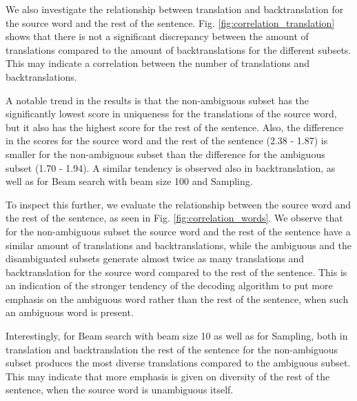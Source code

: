 We also investigate the relationship between translation and backtranslation for the source word and the rest of the sentence. Fig. \ref{fig:correlation_translation} shows that there is not a significant discrepancy between the amount of translations compared to the amount of backtranslations for the different subsets. This may indicate a correlation between the number of translations and backtranslations.

A notable trend in the results is that the non-ambiguous subset has the significantly lowest score in uniqueness for the translations of the source word, but it also has the highest score for the rest of the sentence. Also, the difference in the scores for the source word and the rest of the sentence (2.38 - 1.87) is smaller for the non-ambiguous subset than the difference for the ambiguous subset (1.70 - 1.94). A similar tendency is observed also in backtranslation, as well as for Beam search with beam size 100 and Sampling. 

To inspect this further, we evaluate the relationship between the source word and the rest of the sentence, as seen in Fig. \ref{fig:correlation_words}. We observe that for the non-ambiguous subset the source word and the rest of the sentence have a similar amount of translations and backtranslations, while the ambiguous and the disambiguated subsets generate almost twice as many translations and backtranslation for the source word compared to the rest of the sentence. This is an indication of the stronger tendency of the decoding algorithm to put more emphasis on the ambiguous word rather than the rest of the sentence, when such an ambiguous word is present. 

Interestingly, for Beam search with beam size 10 as well as for Sampling, both in translation and backtranslation the rest of the sentence for the non-ambiguous subset produces the most diverse translations compared to the ambiguous subset. This may indicate that more emphasis is given on diversity of the rest of the sentence, when the source word is unambiguous itself. 

